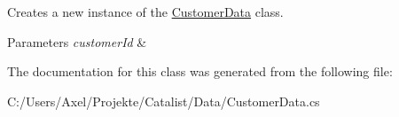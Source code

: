 Creates a new instance of the \hyperlink{class_products_1_1_data_1_1_customer_data}{Customer\+Data} class. 


\begin{DoxyParams}{Parameters}
{\em customer\+Id} & \\
\hline
\end{DoxyParams}


The documentation for this class was generated from the following file\+:\begin{DoxyCompactItemize}
\item 
C\+:/\+Users/\+Axel/\+Projekte/\+Catalist/\+Data/Customer\+Data.\+cs\end{DoxyCompactItemize}
